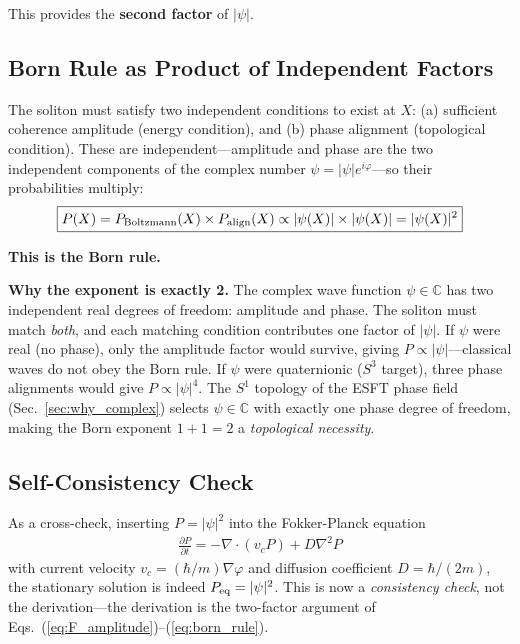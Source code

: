 ﻿\documentclass[twocolumn,showpacs,preprintnumbers,amsmath,amssymb,prd]{revtex4-2}
\begin{document}
This provides the \textbf{second factor} of $|\psi|$.

\subsection{Born Rule as Product of Independent Factors}

The soliton must satisfy two independent conditions to exist at $X$: (a) sufficient coherence amplitude (energy condition), and (b) phase alignment (topological condition). These are independent---amplitude and phase are the two independent components of the complex number $\psi = |\psi| e^{i\varphi}$---so their probabilities multiply:
\begin{align}
\boxed{P(X) = P_{\rm Boltzmann}(X) \times P_{\rm align}(X) \propto |\psi(X)| \times |\psi(X)| = |\psi(X)|^2}
\label{eq:born_rule}
\end{align}

\textbf{This is the Born rule.}

\textbf{Why the exponent is exactly 2.}
The complex wave function $\psi \in \mathbb{C}$ has two independent real degrees of freedom: amplitude and phase. The soliton must match \emph{both}, and each matching condition contributes one factor of $|\psi|$. If $\psi$ were real (no phase), only the amplitude factor would survive, giving $P \propto |\psi|$---classical waves do not obey the Born rule. If $\psi$ were quaternionic ($S^3$ target), three phase alignments would give $P \propto |\psi|^4$. The $S^1$ topology of the ESFT phase field (Sec.~\ref{sec:why_complex}) selects $\psi \in \mathbb{C}$ with exactly one phase degree of freedom, making the Born exponent $1 + 1 = 2$ a \emph{topological necessity}.

\subsection{Self-Consistency Check}

As a cross-check, inserting $P = |\psi|^2$ into the Fokker-Planck equation
\begin{align}
\frac{\partial P}{\partial t} = -\nabla \cdot (v_c P) + D\nabla^2 P
\end{align}
with current velocity $v_c = (\hbar/m)\nabla\varphi$ and diffusion coefficient $D = \hbar/(2m)$, the stationary solution is indeed $P_{\rm eq} = |\psi|^2$. This is now a \emph{consistency check}, not the derivation---the derivation is the two-factor argument of Eqs.~(\ref{eq:F_amplitude})--(\ref{eq:born_rule}).
\end{document}

